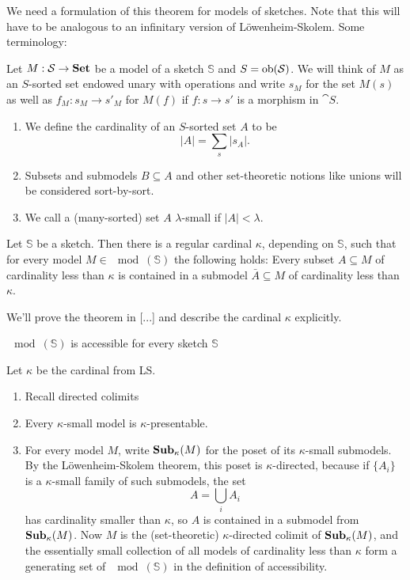 We need a formulation of this theorem for models of sketches. Note that this will have to be analogous to an infinitary version of Löwenheim-Skolem. Some terminology:
\begin{Definition}
Let $M : \mathcal{S} \to \mathbf{Set}$ be a model of a sketch $\mathbb S$ and $S = \textrm{ob}(\mathcal{S})$. We will think of $M$ as an $S$-sorted set endowed unary with operations and write $s_M$ for the set $M(s)$ as well as $f_M : s_M \to s'_M$ for $M(f)$ if $f : s \to s'$ is a morphism in $\cat S$.
\begin{enumerate}
\item We define the cardinality of an $S$-sorted set $A$ to be \[ |A| = \sum_s |s_A|. \]
\item Subsets and submodels $B \subseteq A$ and other set-theoretic notions like unions will be considered sort-by-sort.
\item We call a (many-sorted) set $A$ $\lambda$-small if $|A|<\lambda$.
\end{enumerate}
\end{Definition}

\begin{Theorem}
Let $\mathbb S$ be a sketch. Then there is a regular cardinal $\kappa$, depending on $\mathbb S$, such that for every model $M \in \mod(\mathbb S)$ the following holds: Every subset $A \subseteq M$ of cardinality less than $\kappa$ is contained in a submodel $\bar A \subseteq M$ of cardinality less than $\kappa$.
\end{Theorem}
We'll prove the theorem in [...] and describe the cardinal $\kappa$ explicitly. \\

\begin{Theorem}
$\mod(\mathbb S)$ is accessible for every sketch $\mathbb S$
\end{Theorem}
\begin{Proof}
Let $\kappa$ be the cardinal from LS.
\begin{enumerate}
\item Recall directed colimits
\item Every $\kappa$-small model is $\kappa$-presentable.
\item For every model $M$, write $\mathbf{Sub}_\kappa(M)$ for the poset of its $\kappa$-small submodels. By the Löwenheim-Skolem theorem, this poset is $\kappa$-directed, because if $\{A_i\}$ is a $\kappa$-small family of such submodels, the set
\[ A = \bigcup_i A_i \]
has cardinality smaller than $\kappa$, so $A$ is contained in a submodel from $\mathbf{Sub}_\kappa(M)$. Now $M$ is the (set-theoretic) $\kappa$-directed colimit of $\mathbf{Sub}_\kappa(M)$, and the essentially small collection of all models of cardinality less than $\kappa$ form a generating set of $\mod(\mathbb S)$ in the definition of accessibility.
\end{enumerate}
\end{Proof}



